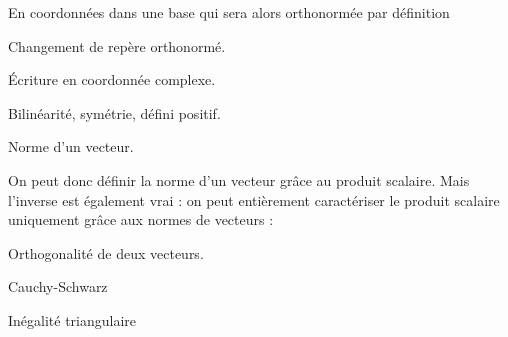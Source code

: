 \begin{definition}
En coordonnées dans une base qui sera alors orthonormée par définition
\end{definition}

\begin{proposition}
Changement de repère orthonormé.
\end{proposition}

\begin{proposition}
Écriture en coordonnée complexe.
\end{proposition}

\begin{proposition}
Bilinéarité, symétrie, défini positif.
\end{proposition}

\begin{definition}
Norme d'un vecteur.
\end{definition}

On peut donc définir la norme d'un vecteur grâce au produit scalaire. Mais l'inverse est également vrai  : on peut entièrement caractériser le produit scalaire uniquement grâce aux normes de vecteurs : 

\begin{proposition}

\end{proposition}

\begin{definition}
Orthogonalité de deux vecteurs.
\end{definition}

\begin{proposition}
Cauchy-Schwarz
\end{proposition}

\begin{proposition}
Inégalité triangulaire
\end{proposition}


